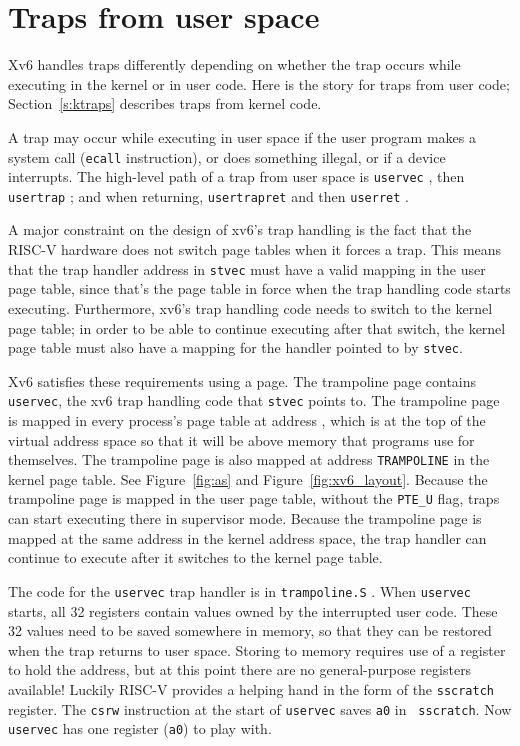 \section{Traps from user space}

Xv6 handles traps differently depending on whether
the trap occurs while
executing in the kernel or in user code. Here is the
story for traps from user code; Section~\ref{s:ktraps}
describes traps from kernel code.

A trap may occur while executing in user space if the
user program makes a
system call ({\tt ecall} instruction), or does something
illegal, or if a device interrupts.
The high-level path of a trap from user space is
{\tt uservec}
,
then {\tt usertrap}
;
and when returning,
{\tt usertrapret}
and then
{\tt userret}
.


A major constraint on the design of xv6's trap handling is the fact
that the RISC-V hardware does not switch page tables when it forces a
trap. This means that the trap handler
address in {\tt stvec} must have a valid
mapping in the user page table, since that's the page table in force
when the trap handling code starts executing. Furthermore, xv6's trap
handling code needs to switch to the kernel page table; in order to be
able to continue executing after that switch, the kernel page table
must also have a mapping for the handler pointed to by {\tt stvec}.

Xv6 satisfies these requirements using a  page.
The trampoline page contains {\tt uservec}, the xv6 trap handling code
that {\tt stvec} points to. The trampoline page is mapped in
every process's page table at address
,
which is at the top of the virtual address space so that it will
be above memory that programs use for themselves.
The trampoline page is also mapped at address {\tt TRAMPOLINE}
in the kernel page table. See Figure~\ref{fig:as} and
Figure~\ref{fig:xv6_layout}. Because the trampoline page is mapped in
the user page table, without the {\tt PTE\_U} flag, traps can start
executing there in supervisor mode. Because the trampoline page is
mapped at the same address in the kernel address space, the trap handler
can continue to execute after it switches to the kernel page
table.

The code for the {\tt uservec} trap handler is in {\tt trampoline.S}
.
When {\tt uservec} starts, all 32 registers contain values owned by
the interrupted user code. These 32 values need to be saved somewhere
in memory, so that
they can be restored when the trap returns to user space.
Storing to memory requires use of a register
to hold the address,
but at this point there are no general-purpose registers available!
Luckily RISC-V provides a helping hand in the
form of the {\tt sscratch} register. The {\tt csrw} instruction at
the start of {\tt uservec} saves {\tt a0} in {\tt
  sscratch}. Now 
{\tt uservec} has
one register ({\tt a0}) to play with.

